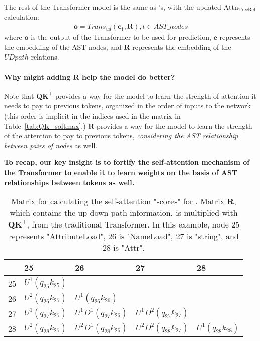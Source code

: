 \documentclass[nonacm, sigconf]{acmart}
\renewcommand{\vec}[1]{\boldsymbol{#1}}
\newcommand{\mat}[1]{\boldsymbol{#1}}
\newcommand{\AttnTreeRel}{\text{Attn}_\text{TreeRel}}
\newcommand{\tabref}[1]{Table~\ref{#1}}
\begin{document}
The rest of the Transformer model is the same as \DFS's, with the updated $\AttnTreeRel$ calculation:
\begin{align*}
    \vec{o} = \mathit{Trans}_{ud}(\vec{e_{t}}, \mat{R}), t\in AST\_nodes
\end{align*}
where $\vec{o}$ is the output of the Transformer to be used for prediction, $\vec{e}$ represents the embedding of the AST nodes, and $\mat{R}$ represents the embedding of the $\mathit{UDpath}$ relations.

\paragraph{Why might adding $\mat{R}$ help the model do better?}
Note that $\mat{Q}\mat{K}^{\top}$ provides a way for the model to learn the strength of attention it needs to pay to previous tokens, organized in the order of inputs to the network (this order is implicit in the indices used in the matrix in \tabref{tab:QK_softmax}.)   $\mat{R}$ provides a way for the model to learn the strength of the attention to pay to previous tokens, \textit{considering the AST relationship between pairs of nodes} as well.

\bigskip

\textbf{To recap, our key insight is to fortify the self-attention mechanism of the Transformer to enable it to learn weights on the basis of AST relationships between tokens as well.}

\begin{table}
\begin{tabular}{|l|l|l|l|l|}  
\hline
& 25 & 26  & 27 & 28  \\ 
\hline
25
    & $U^1(q_{25}k_{25})$ &&& \\
26   
    & $U^2(q_{26}k_{25})$ 
    & $U^1(q_{26}k_{26})$ && \\ 
27   
    & $U^1(q_{27}k_{25})$ 
    & $U^1D^1(q_{27}k_{26})$ 
    & $U^1D^2(q_{27}k_{27})$ & \\
28
    & $U^2(q_{28}k_{25})$ 
    & $U^2D^1(q_{28}k_{26})$
    & $U^2D^2(q_{28}k_{27})$  
    & $U^1(q_{28}k_{28})$  \\
\hline
\end{tabular}
\caption{Matrix for calculating the self-attention "scores" for \TreeRel. Matrix $\vec{R}$, which contains the up down path information, is multiplied with $\vec{Q}\vec{K}^\intercal$, from the traditional Transformer. In this example, node 25 represents "AttributeLoad", 26 is "NameLoad", 27 is "string", and 28 is "Attr".}
\label{tab:QKR}
\end{table}
\end{document}
